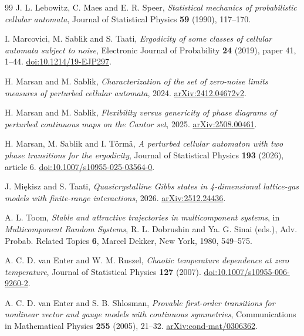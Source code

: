 \documentclass[11pt]{article}
\theoremstyle{plain}
\theoremstyle{definition}
\theoremstyle{remark}
\begin{document}
\begin{thebibliography}{99}
J. L. Lebowitz, C. Maes and E. R. Speer, \emph{Statistical mechanics of probabilistic cellular automata},
Journal of Statistical Physics \textbf{59} (1990), 117--170.

I. Marcovici, M. Sablik and S. Taati,
\emph{Ergodicity of some classes of cellular automata subject to noise},
Electronic Journal of Probability \textbf{24} (2019), paper 41, 1--44.
\href{https://doi.org/10.1214/19-EJP297}{doi:10.1214/19-EJP297}.

H. Marsan and M. Sablik, \emph{Characterization of the set of zero-noise limits measures of perturbed cellular automata}, 2024.
\href{https://arxiv.org/abs/2412.04672v2}{arXiv:2412.04672v2}.

H. Marsan and M. Sablik, \emph{Flexibility versus genericity of phase diagrams of perturbed continuous maps on the Cantor set}, 2025.
\href{https://arxiv.org/abs/2508.00461}{arXiv:2508.00461}.

H. Marsan, M. Sablik and I. T\"orm\"a,
\emph{A perturbed cellular automaton with two phase transitions for the ergodicity},
Journal of Statistical Physics \textbf{193} (2026), article 6.
\href{https://doi.org/10.1007/s10955-025-03564-0}{doi:10.1007/s10955-025-03564-0}.

J. Mi\k{e}kisz and S. Taati, \emph{Quasicrystalline Gibbs states in 4-dimensional lattice-gas models with finite-range interactions}, 2026.
\href{https://arxiv.org/abs/2512.24436}{arXiv:2512.24436}.

A. L. Toom, \emph{Stable and attractive trajectories in multicomponent systems},
in \emph{Multicomponent Random Systems}, R. L. Dobrushin and Ya. G. Sinai (eds.),
Adv. Probab. Related Topics \textbf{6}, Marcel Dekker, New York, 1980, 549--575.

A. C. D. van Enter and W. M. Ruszel, \emph{Chaotic temperature dependence at zero temperature},
Journal of Statistical Physics \textbf{127} (2007).
\href{https://doi.org/10.1007/s10955-006-9260-2}{doi:10.1007/s10955-006-9260-2}.

A. C. D. van Enter and S. B. Shlosman, \emph{Provable first-order transitions for nonlinear vector and gauge models with continuous symmetries},
Communications in Mathematical Physics \textbf{255} (2005), 21--32.
\href{https://arxiv.org/abs/cond-mat/0306362}{arXiv:cond-mat/0306362}.
\end{thebibliography}
\end{document}
